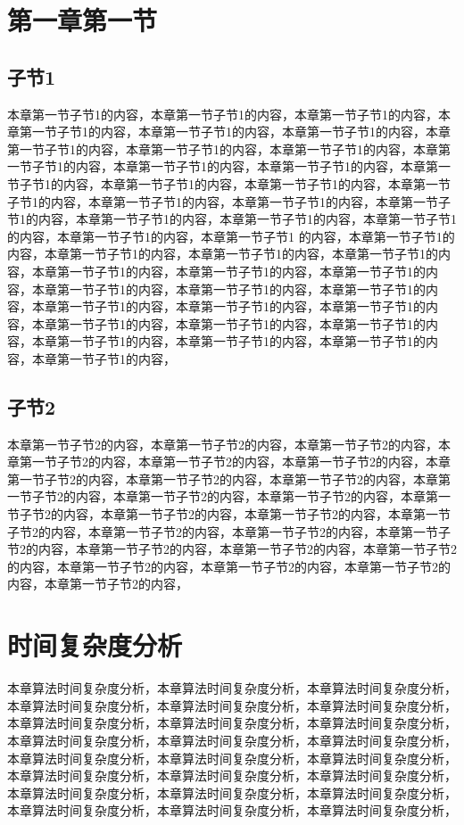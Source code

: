 \documentclass[unicode,pdfcover]{hquthesis}
\begin{document}
\section{第一章第一节}

\subsection{子节1}

本章第一节子节1的内容，本章第一节子节1的内容，本章第一节子节1的内容，本章第一节子节1的内容，本章第一节子节1的内容，本章第一节子节1的内容，本章第一节子节1的内容，本章第一节子节1的内容，本章第一节子节1的内容，本章第一节子节1的内容，本章第一节子节1的内容，本章第一节子节1的内容，本章第一节子节1的内容，本章第一节子节1的内容，本章第一节子节1的内容，本章第一节子节1的内容，本章第一节子节1的内容，本章第一节子节1的内容，本章第一节子节1的内容，本章第一节子节1的内容，本章第一节子节1的内容，本章第一节子节1的内容，本章第一节子节1的内容，本章第一节子节1 的内容，本章第一节子节1的内容，本章第一节子节1的内容，本章第一节子节1的内容，本章第一节子节1的内容，本章第一节子节1的内容，本章第一节子节1的内容，本章第一节子节1的内容，本章第一节子节1的内容，本章第一节子节1的内容，本章第一节子节1的内容，本章第一节子节1的内容，本章第一节子节1的内容，本章第一节子节1的内容，本章第一节子节1的内容，本章第一节子节1的内容，本章第一节子节1的内容，本章第一节子节1的内容，本章第一节子节1的内容，本章第一节子节1的内容，本章第一节子节1的内容，

\subsection{子节2}

本章第一节子节2的内容，本章第一节子节2的内容，本章第一节子节2的内容，本章第一节子节2的内容，本章第一节子节2的内容，本章第一节子节2的内容，本章第一节子节2的内容，本章第一节子节2的内容，本章第一节子节2的内容，本章第一节子节2的内容，本章第一节子节2的内容，本章第一节子节2的内容，本章第一节子节2的内容，本章第一节子节2的内容，本章第一节子节2的内容，本章第一节子节2的内容，本章第一节子节2的内容，本章第一节子节2的内容，本章第一节子节2的内容，本章第一节子节2的内容，本章第一节子节2的内容，本章第一节子节2的内容，本章第一节子节2的内容，本章第一节子节2的内容，本章第一节子节2的内容，本章第一节子节2的内容，

\section{时间复杂度分析}

本章算法时间复杂度分析，本章算法时间复杂度分析，本章算法时间复杂度分析，本章算法时间复杂度分析，本章算法时间复杂度分析，本章算法时间复杂度分析，本章算法时间复杂度分析，本章算法时间复杂度分析，本章算法时间复杂度分析，本章算法时间复杂度分析，本章算法时间复杂度分析，本章算法时间复杂度分析，本章算法时间复杂度分析，本章算法时间复杂度分析，本章算法时间复杂度分析，本章算法时间复杂度分析，本章算法时间复杂度分析，本章算法时间复杂度分析，本章算法时间复杂度分析，本章算法时间复杂度分析，本章算法时间复杂度分析，本章算法时间复杂度分析，本章算法时间复杂度分析，本章算法时间复杂度分析，
\end{document}
